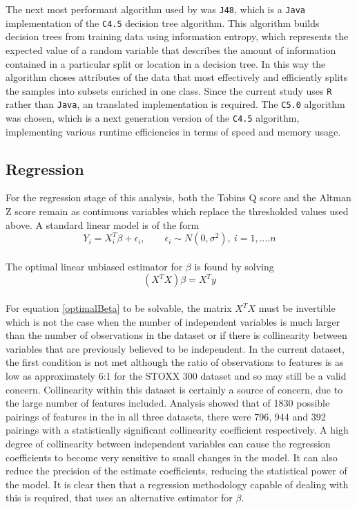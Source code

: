 {{The next most performant algorithm used by \cite{moldovan2015learning} was \texttt{J48}, which is a \texttt{Java} implementation of the \texttt{C4.5} decision tree algorithm. This algorithm builds decision trees from training data using information entropy, which represents the expected value of a random variable that describes the amount of information contained in a particular split or location in a decision tree. In this way the algorithm choses attributes of the data that most effectively and efficiently splits the samples into subsets enriched in one class. Since the current study uses \texttt{R} rather than \texttt{Java}, an translated implementation is required. The \texttt{C5.0} algorithm was chosen, which is a next generation version of the \texttt{C4.5} algorithm, implementing various runtime efficiencies in terms of speed and memory usage.}
\subsection{Regression}
{For the regression stage of this analysis, both the Tobins Q score and the Altman Z score remain as continuous variables which replace the thresholded values used above.  A standard linear model is of the form
\begin {equation}\label{linearModel}
Y_i = X_i^T \beta + \epsilon_i, \qquad \epsilon_i \sim N(0, \sigma^2), \ i = 1,....n
\end{equation}\\
The optimal linear unbiased estimator for $\beta$ is found by solving 
\begin {equation}\label{optimalBeta}
(X^T X)\beta = X^T y
\end{equation}\\
For equation \ref{optimalBeta} to be solvable, the matrix $X^T X$ must be invertible which is not the case when the number of independent variables is much larger than the number of observations in the dataset or if there is collinearity between variables that are previously believed to be independent. In the current dataset, the first condition is not met although the ratio of observations to features is as low as approximately 6:1 for the STOXX 300 dataset and so may still be a valid concern. Collinearity within this dataset is certainly a source of concern, due to the large number of features included. Analysis showed that of 1830 possible pairings of features in the in all three datasets, there were 796, 944 and 392 pairings with a statistically significant collinearity coefficient respectively. A high degree of collinearity between independent variables can cause the regression coefficients to become very sensitive to small changes in the model. It can also reduce the precision of the estimate coefficients, reducing the statistical power of the model.  It is clear then that a regression methodology capable of dealing with this is required, that uses an alternative estimator for $\beta$. \\\\
}}
